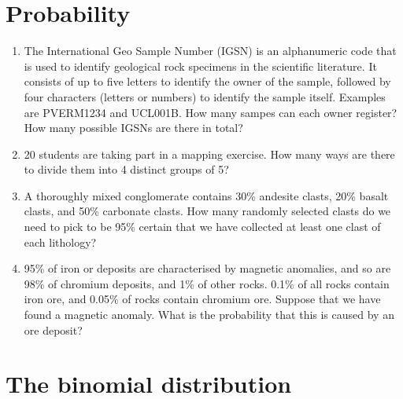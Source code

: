 \section{Probability}
\label{sec:ex-probability}

\begin{enumerate}
  
\item The International Geo Sample Number (IGSN) is an alphanumeric
  code that is used to identify geological rock specimens in the
  scientific literature. It consists of up to five letters to identify
  the owner of the sample, followed by four characters (letters or
  numbers) to identify the sample itself. Examples are PVERM1234 and
  UCL001B. How many sampes can each owner register? How many possible
  IGSNs are there in total?

\item 20 students are taking part in a mapping exercise. How many ways
  are there to divide them into 4 distinct groups of 5?
  
\item A thoroughly mixed conglomerate contains 30\% andesite clasts,
  20\% basalt clasts, and 50\% carbonate clasts. How many randomly
  selected clasts do we need to pick to be 95\% certain that we have
  collected at least one clast of each lithology?

\item 95\% of iron or deposits are characterised by magnetic
  anomalies, and so are 98\% of chromium deposits, and 1\% of other
  rocks.  0.1\% of all rocks contain iron ore, and 0.05\% of rocks
  contain chromium ore. Suppose that we have found a magnetic anomaly.
  What is the probability that this is caused by an ore deposit?

\end{enumerate}
  
\section{The binomial distribution}
\label{sec:ex-binomial}

